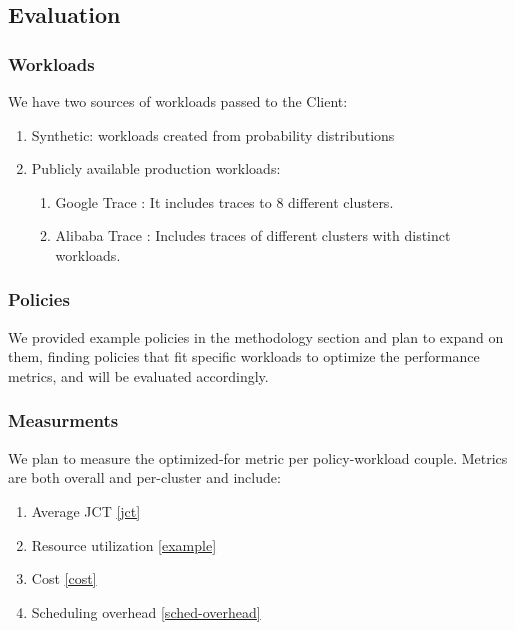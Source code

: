 \subsection{Evaluation}
\subsubsection{Workloads}
We have two sources of workloads passed to the Client:
\begin{enumerate}
    \item Synthetic: workloads created from probability distributions
    \item Publicly available production workloads: 
        \begin{enumerate}
            \item Google Trace \cite{wilkes_yet_2020} \cite{borg}: It includes traces to 8 different clusters. 
            \item Alibaba Trace \cite{alibaba-latest} \cite{alibabaclusterdata_2023}: Includes traces of different clusters with distinct workloads.        
        \end{enumerate}
\end{enumerate}

\subsubsection{Policies}
We provided example policies in the methodology section and plan to expand on them, finding policies that  
fit specific workloads to optimize the performance metrics, and will be evaluated accordingly. 

\subsubsection{Measurments}
We plan to measure the optimized-for metric per policy-workload couple. 
Metrics are both overall and per-cluster and include:
\begin{enumerate}
    \item Average JCT \ref{jct}
    \item Resource utilization \ref{example} 
    \item Cost \ref{cost} 
    \item Scheduling overhead \ref{sched-overhead}
\end{enumerate}
